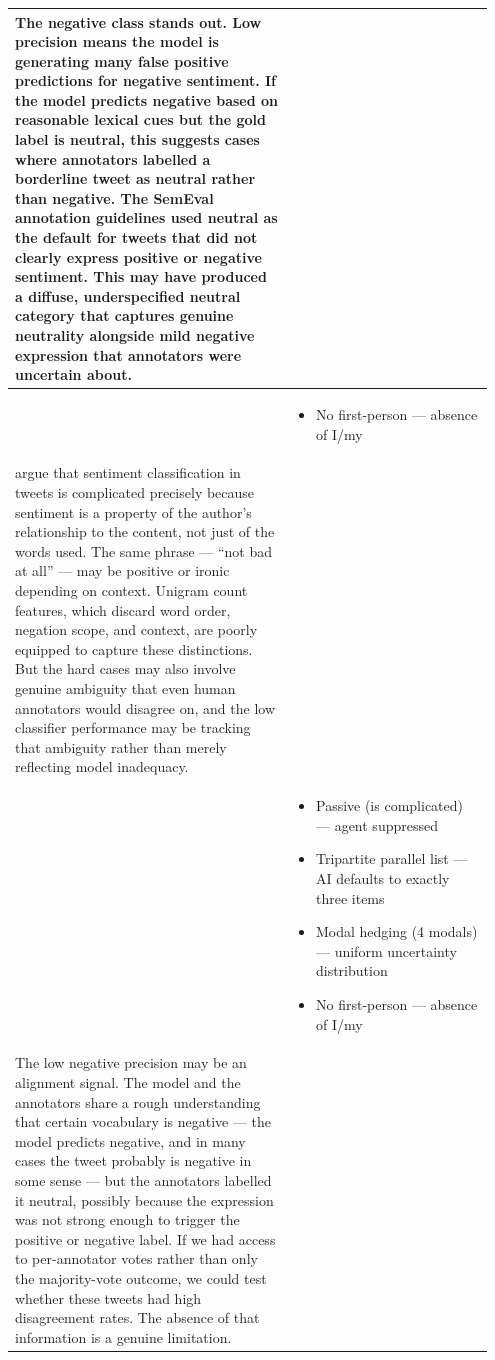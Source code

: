 \documentclass[11pt]{article}
\begin{document}
\begin{longtable}{|p{0.55\linewidth}|p{0.40\linewidth}|}
\hline
The negative class stands out. Low precision means the model is generating many false positive predictions for negative sentiment. If the model predicts negative based on reasonable lexical cues but the gold label is neutral, this suggests cases where annotators labelled a borderline tweet as neutral rather than negative. The SemEval annotation guidelines used neutral as the default for tweets that did not clearly express positive or negative sentiment. This may have produced a diffuse, underspecified neutral category that captures genuine neutrality alongside mild negative expression that annotators were uncertain about. & \\[2pt]
\hline
\rule[-3.5cm]{0pt}{3.5cm} & \begin{itemize}[leftmargin=1em,itemsep=1pt,topsep=1pt,parsep=0pt]
  \item No first-person --- absence of I/my
\end{itemize} \\
\hline
argue that sentiment classification in tweets is complicated precisely because sentiment is a property of the author's relationship to the content, not just of the words used. The same phrase --- ``not bad at all'' --- may be positive or ironic depending on context. Unigram count features, which discard word order, negation scope, and context, are poorly equipped to capture these distinctions. But the hard cases may also involve genuine ambiguity that even human annotators would disagree on, and the low classifier performance may be tracking that ambiguity rather than merely reflecting model inadequacy. & \\[2pt]
\hline
\rule[-3.5cm]{0pt}{3.5cm} & \begin{itemize}[leftmargin=1em,itemsep=1pt,topsep=1pt,parsep=0pt]
  \item Passive (is complicated) --- agent suppressed
  \item Tripartite parallel list --- AI defaults to exactly three items
  \item Modal hedging (4 modals) --- uniform uncertainty distribution
  \item No first-person --- absence of I/my
\end{itemize} \\
\hline
The low negative precision may be an alignment signal. The model and the annotators share a rough understanding that certain vocabulary is negative --- the model predicts negative, and in many cases the tweet probably is negative in some sense --- but the annotators labelled it neutral, possibly because the expression was not strong enough to trigger the positive or negative label. If we had access to per-annotator votes rather than only the majority-vote outcome, we could test whether these tweets had high disagreement rates. The absence of that information is a genuine limitation. & \\[2pt]

\end{longtable}
\end{document}
